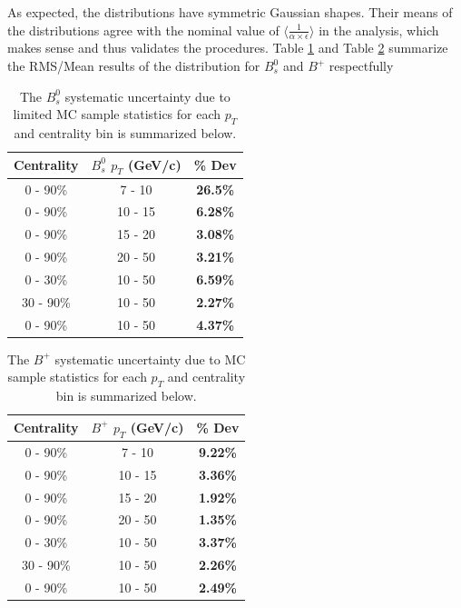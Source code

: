 As expected, the distributions have symmetric Gaussian shapes. Their means of the distributions agree with the nominal value of $\langle\frac{1}{\alpha \times \epsilon}\rangle$ in the analysis, which makes sense and thus validates the procedures. Table \ref{BsMCStatSyst} and Table \ref{BPMCStatSyst} summarize the RMS/Mean results of the distribution for $B^0_s$ and $B^+$ respectfully 

\begin{table}[h]
\begin{center}
\caption{The $B^0_s$ systematic uncertainty due to limited MC sample statistics for each $p_T$ and centrality bin is summarized below.}
\vspace{1em}
\label{BsMCStatSyst}
  \begin{tabular}{| c | c |c |}
    \hline
     Centrality & $B^0_s$ $p_T$ (GeV/c) & \% Dev \\
    \hline
    \hline
0 - 90\% & 7 - 10 &   \textbf{26.5\% }     \\ 
0 - 90\% & 10 - 15 & \textbf{6.28\% }    \\ 
0 - 90\% & 15 - 20 &  \textbf{3.08\% }     \\ 
0 - 90\% & 20 - 50 &  \textbf{3.21\% }    \\ 
0 - 30\% & 10 - 50 &   \textbf{6.59\% }  \\ 
30 - 90\% & 10 - 50 & \textbf{2.27\% }    \\ 
0 - 90\% & 10 - 50 &  \textbf{4.37\% }   \\ 
    \hline
    \hline
\end{tabular}
\end{center}
\end{table}



\begin{table}[h]
\begin{center}
\caption{The $B^+$ systematic uncertainty due to MC sample statistics for each $p_T$ and centrality bin is summarized below.}
\vspace{1em}
\label{BPMCStatSyst}
  \begin{tabular}{| c | c |c |}
    \hline
     Centrality & $B^+$ $p_T$ (GeV/c) & \% Dev \\
    \hline
    \hline
0 - 90\% & 7 - 10 &   \textbf{9.22\% }     \\ 
0 - 90\% & 10 - 15 & \textbf{3.36\% }    \\ 
0 - 90\% & 15 - 20 &  \textbf{1.92\% }     \\ 
0 - 90\% & 20 - 50 &  \textbf{1.35\% }    \\ 
0 - 30\% & 10 - 50 &   \textbf{3.37\% }  \\ 
30 - 90\% & 10 - 50 & \textbf{2.26\% }    \\ 
0 - 90\% & 10 - 50 &  \textbf{2.49\% }   \\ 
    \hline
    \hline
\end{tabular}
\end{center}
\end{table}

